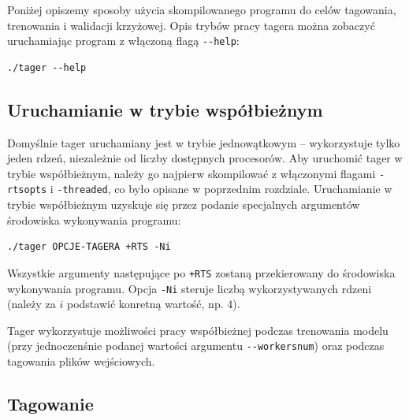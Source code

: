 \documentclass[a4paper,10]{article}
\begin{document}
Poniżej opiszemy sposoby użycia skompilowanego programu do celów
tagowania, trenowania i walidacji krzyżowej. Opis trybów
pracy tagera można zobaczyć uruchamiając program z włączoną
flagą \verb|--help|:
\begin{verbatim}
./tager --help
\end{verbatim}

\subsection{Uruchamianie w trybie współbieżnym}

Domyślnie tager uruchamiany jest w trybie jednowątkowym -- wykorzystuje
tylko jeden rdzeń, niezależnie od liczby dostępnych procesorów.
Aby uruchomić tager w trybie współbieżnym, należy go najpierw skompilować
z włączonymi flagami \verb|-rtsopts| i \verb|-threaded|, co było
opisane w poprzednim rozdziale.
Uruchamianie w trybie współbieżnym uzyskuje się przez podanie specjalnych
argumentów środowiska wykonywania programu:
\begin{verbatim}
./tager OPCJE-TAGERA +RTS -Ni
\end{verbatim}
Wszystkie argumenty następujące po \verb|+RTS| zostaną przekierowany
do środowiska wykonywania programu. Opcja \verb|-Ni| steruje
liczbą wykorzystywanych rdzeni (należy za $i$ podstawić konretną wartość,
np. $4$).

Tager wykorzystuje możliwości pracy współbieżnej podczas
trenowania modelu (przy jednoczenśnie podanej wartości
argumentu \verb|--workersnum|) oraz podczas tagowania
plików wejściowych.

\subsection{Tagowanie}
\end{document}
